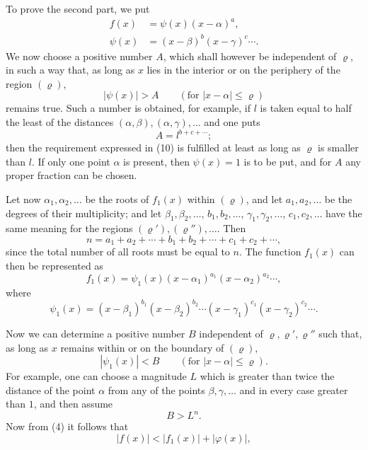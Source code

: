 
To prove the second part, we put
\begin{align}
 f(x)&=\psi(x)(x-\alpha)^a,
\tag{8}\\
 \psi(x)&=(x-\beta)^b(x-\gamma)^c\cdots .
\tag{9}
\end{align}
We now choose a positive number $A$, which shall however be independent of $\varrho$, in such a way that, as long as $x$ lies in the interior or on the periphery of the region $(\varrho)$,
\begin{equation}
 |\psi(x)|>A \qquad (\text{for } |x-\alpha|\le \varrho)
\tag{10}
\end{equation}
remains true. Such a number is obtained, for example, if $l$ is taken equal to half the least of the distances $(\alpha,\beta),(\alpha,\gamma),\ldots$ and one puts
\[
 A=l^{b+c+\cdots};
\]
then the requirement expressed in (10) is fulfilled at least as long as $\varrho$ is smaller than $l$. If only one point $\alpha$ is present, then $\psi(x)=1$ is to be put, and for $A$ any proper fraction can be chosen.

Let now $\alpha_1,\alpha_2,
\ldots$ be the roots of $f_1(x)$ within $(\varrho)$, and let $a_1,a_2,
\ldots$ be the degrees of their multiplicity; and let $\beta_1,\beta_2,
\ldots$, $b_1,b_2,
\ldots$, $\gamma_1,\gamma_2,
\ldots$, $c_1,c_2,
\ldots$ have the same meaning for the regions $(\varrho'),(\varrho''),\ldots$. Then
\begin{equation}
 n=a_1+a_2+\cdots+b_1+b_2+\cdots+c_1+c_2+\cdots,
\tag{11}
\end{equation}
since the total number of all roots must be equal to $n$. The function $f_1(x)$ can then be represented as
\begin{equation}
 f_1(x)=\psi_1(x)(x-\alpha_1)^{a_1}(x-\alpha_2)^{a_2}\cdots,
\tag{12}
\end{equation}
where
\begin{equation}
 \psi_1(x)=(x-\beta_1)^{b_1}(x-\beta_2)^{b_2}\cdots
          (x-\gamma_1)^{c_1}(x-\gamma_2)^{c_2}\cdots .
\tag{13}
\end{equation}

Now we can determine a positive number $B$ independent of $\varrho,\varrho',\varrho''$ such that, as long as $x$ remains within or on the boundary of $(\varrho)$,
\begin{equation}
 |\psi_1(x)|<B \qquad (\text{for } |x-\alpha|\le \varrho).
\tag{14}
\end{equation}
For example, one can choose a magnitude $L$ which is greater than twice the distance of the point $\alpha$ from any of the points $\beta,\gamma,\ldots$ and in every case greater than $1$, and then assume
\[
 B>L^n .
\]
Now from (4) it follows that
\begin{equation}
 |f(x)|<|f_1(x)|+|\varphi(x)|,
\tag{15}
\end{equation}
